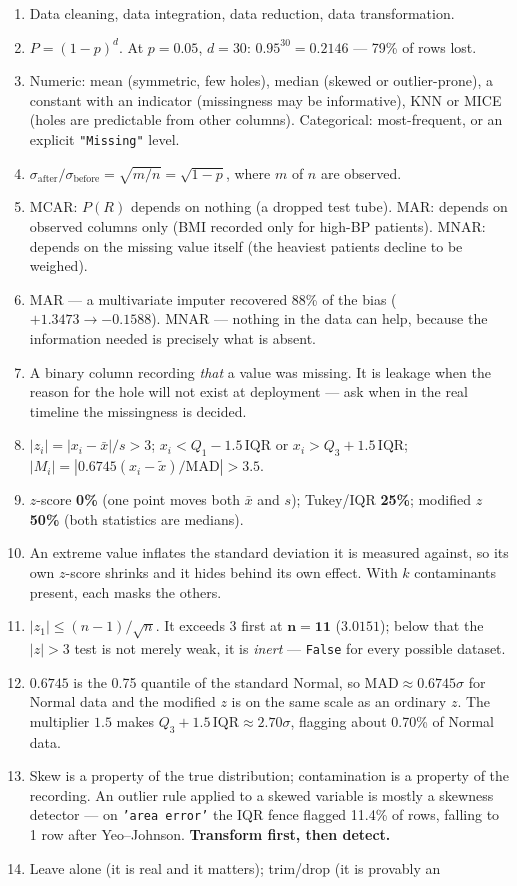 \documentclass[11pt,a4paper]{article}
\newcommand{\A}[1]{\item[\textbf{#1}]}
\begin{document}
\begin{enumerate}[leftmargin=1.9cm]
\A{U4.1} Data cleaning, data integration, data reduction, data transformation.
\A{U4.2} $P = (1-p)^d$. At $p=0.05$, $d=30$: $0.95^{30} = \mathbf{0.2146}$ ---
79\% of rows lost.
\A{U4.3} Numeric: mean (symmetric, few holes), median (skewed or
outlier-prone), a constant with an indicator (missingness may be informative),
KNN or MICE (holes are predictable from other columns). Categorical:
most-frequent, or an explicit \texttt{"Missing"} level.
\A{U4.4} $\sigma_{\text{after}}/\sigma_{\text{before}} = \sqrt{m/n} =
\sqrt{1-p}$, where $m$ of $n$ are observed.
\A{U4.5} MCAR: $P(R)$ depends on nothing (a dropped test tube). MAR: depends on
observed columns only (BMI recorded only for high-BP patients). MNAR: depends
on the missing value itself (the heaviest patients decline to be weighed).
\A{U4.6} MAR --- a multivariate imputer recovered 88\% of the bias
($+1.3473 \to -0.1588$). MNAR --- nothing in the data can help, because the
information needed is precisely what is absent.
\A{U4.7} A binary column recording \emph{that} a value was missing. It is
leakage when the reason for the hole will not exist at deployment --- ask when
in the real timeline the missingness is decided.
\A{U4.8} $|z_i| = |x_i - \bar x|/s > 3$; $x_i < Q_1 - 1.5\,\text{IQR}$ or
$x_i > Q_3 + 1.5\,\text{IQR}$; $|M_i| = |0.6745(x_i - \tilde x)/\text{MAD}| >
3.5$.
\A{U4.9} $z$-score \textbf{0\%} (one point moves both $\bar x$ and $s$);
Tukey/IQR \textbf{25\%}; modified $z$ \textbf{50\%} (both statistics are
medians).
\A{U4.10} An extreme value inflates the standard deviation it is measured
against, so its own $z$-score shrinks and it hides behind its own effect. With
$k$ contaminants present, each masks the others.
\A{U4.11} $|z_1| \le (n-1)/\sqrt n$. It exceeds 3 first at
$\mathbf{n = 11}$ ($3.0151$); below that the $|z|>3$ test is not merely weak,
it is \emph{inert} --- \texttt{False} for every possible dataset.
\A{U4.12} $0.6745$ is the 0.75 quantile of the standard Normal, so
$\text{MAD} \approx 0.6745\sigma$ for Normal data and the modified $z$ is on
the same scale as an ordinary $z$. The multiplier $1.5$ makes
$Q_3 + 1.5\,\text{IQR} \approx 2.70\sigma$, flagging about 0.70\% of Normal
data.
\A{U4.13} Skew is a property of the true distribution; contamination is a
property of the recording. An outlier rule applied to a skewed variable is
mostly a skewness detector --- on \texttt{'area error'} the IQR fence flagged
11.4\% of rows, falling to 1 row after Yeo--Johnson. \textbf{Transform first,
then detect.}
\A{U4.14} Leave alone (it is real and it matters); trim/drop (it is provably an

\end{enumerate}
\end{document}
